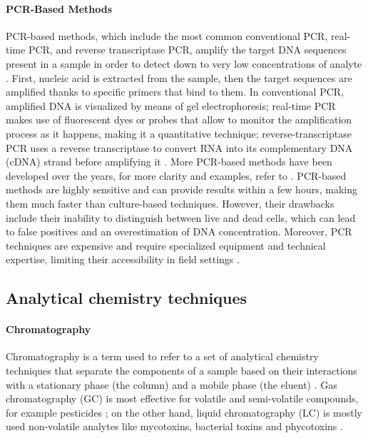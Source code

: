 \paragraph{PCR-Based Methods}
PCR-based methods, which include the most common conventional PCR, real-time PCR, and reverse transcriptase PCR, amplify the target DNA sequences present in a sample in order to detect down to very low concentrations of analyte \citep{salazarPolymerase2015}. First, nucleic acid is extracted from the sample, then the target sequences are amplified thanks to specific primers that bind to them. In conventional PCR, amplified DNA is visualized by means of gel electrophoresis; real-time PCR makes use of fluorescent dyes or probes that allow to monitor the amplification process as it happens, making it a quantitative technique; reverse-transcriptase PCR uses a reverse transcriptase to convert RNA into its complementary DNA (cDNA) strand before amplifying it \citep{liLuminescent2020}. More PCR-based methods have been developed over the years, for more clarity and examples, refer to \citet{singhCritical2014}. PCR-based methods are highly sensitive and can provide results within a few hours, making them much faster than culture-based techniques. However, their drawbacks include their inability to distinguish between live and dead cells, which can lead to false positives and an overestimation of DNA concentration. Moreover, PCR techniques are expensive and require specialized equipment and technical expertise, limiting their accessibility in field settings \citep{velusamyOverview2010,kabirazConventional2023}.

\subsection{Analytical chemistry techniques}
\label{sec:chemistry_detection}

\paragraph{Chromatography}
Chromatography is a term used to refer to a set of analytical chemistry techniques that separate the components of a sample based on their interactions with a stationary phase (the column) and a mobile phase (the eluent) \citep{malikLiquid2010,zhangRapid2021}. Gas chromatography (GC) is most effective for volatile and semi-volatile compounds, for example pesticides \citep{walorczykPesticide2016, nolvachaiMultidimensional2017, fengGas2019}; on the other hand, liquid chromatography (LC) is mostly used non-volatile analytes like mycotoxins, bacterial toxins and phycotoxins \citep{yamatodaniHighperformance1985,nieHighperformance2019,fedorenkoRecent2023,quintanilla-villanuevaRecent2024}.

